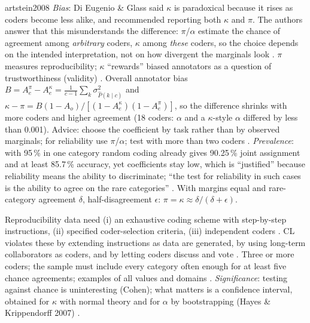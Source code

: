 \begin{papercard}{artstein2008}
 \emph{Bias}: Di Eugenio \& Glass said $\kappa$ is paradoxical because it rises as coders become less alike, and recommended reporting both $\kappa$ and $\pi$. The authors answer that this misunderstands the difference: $\pi$/$\alpha$ estimate the chance of agreement among \emph{arbitrary} coders, $\kappa$ among \emph{these} coders, so the choice depends on the intended interpretation, not on how divergent the marginals look . $\pi$ measures reproducibility; $\kappa$ ``rewards'' biased annotators as a question of trustworthiness (validity) . Overall annotator bias $B=A^\pi_e-A^\kappa_e=\frac{1}{c-1}\sum_k\sigma^2_{\hat P(k\mid c)}$ and $\kappa-\pi=B(1-A_o)/[(1-A^\kappa_e)(1-A^\pi_e)]$, so the difference shrinks with more coders and higher agreement (18 coders: $\alpha$ and a $\kappa$-style $\alpha$ differed by less than 0.001). Advice: choose the coefficient by task rather than by observed marginals; for reliability use $\pi$/$\alpha$; test with more than two coders . \emph{Prevalence}: with 95\,\% in one category random coding already gives 90.25\,\% joint assignment and at least 85.7\,\% accuracy, yet coefficients stay low, which is ``justified'' because reliability means the ability to discriminate; ``the test for reliability in such cases is the ability to agree on the rare categories'' . With margins equal and rare-category agreement $\delta$, half-disagreement $\epsilon$: $\pi=\kappa\approx\delta/(\delta+\epsilon)$.

 Reproducibility data need (i) an exhaustive coding scheme with step-by-step instructions, (ii) specified coder-selection criteria, (iii) independent coders . CL violates these by extending instructions as data are generated, by using long-term collaborators as coders, and by letting coders discuss and vote . Three or more coders; the sample must include every category often enough for at least five chance agreements; examples of all values and domains . \emph{Significance}: testing against chance is uninteresting (Cohen); what matters is a confidence interval, obtained for $\kappa$ with normal theory and for $\alpha$ by bootstrapping (Hayes \& Krippendorff 2007) .


\end{papercard}
